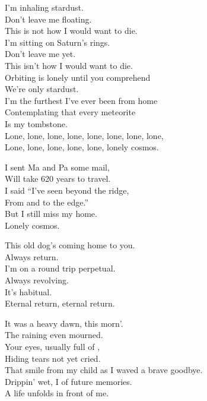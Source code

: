 
I'm inhaling stardust. \\
Don't leave me floating. \\
This is not how I would want to die. \\
I'm sitting on Saturn's rings. \\

Don't leave me yet. \\
This isn't how I would want to die. \\
Orbiting is lonely until you comprehend \\
We're only stardust. \\
I'm the furthest I've ever been from home \\
Contemplating that every meteorite \\
Is my tombstone. \\

Lone, lone, lone, lone, lone, lone, lone, lone, \\
Lone, lone, lone, lone, lone, lonely cosmos. \\


I sent Ma and Pa some mail, \\
Will take 620 years to travel. \\
I said ``I've seen beyond the ridge, \\
From  and to the edge.'' \\
But I still miss my home. \\
Lonely cosmos. \\





This old dog's coming home to you. \\
Always return. \\
I'm on a round trip perpetual. \\
Always revolving. \\
It's habitual. \\
Eternal return, eternal return. \\


It was a heavy dawn, this morn'. \\
The raining  even mourned. \\
Your eyes, usually full of , \\
Hiding tears not yet cried. \\
That smile from my child as I waved a brave goodbye. \\
Drippin' wet, I  of future memories. \\
A life unfolds in front of me. \\

